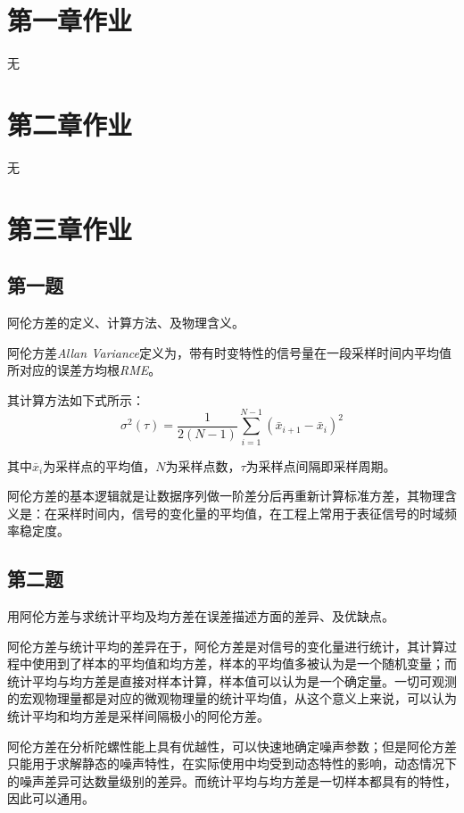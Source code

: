 \documentclass[11pt]{article}
\begin{document}
\newpage

\setcounter{tocdepth}{3}
\tableofcontents
\newpage

\setcounter{page}{1}
\section{第一章作业}
无
\section{第二章作业}
无
\section{第三章作业}
\subsection{第一题}
{\heiti 阿伦方差的定义、计算方法、及物理含义。}\par
阿伦方差\textit{Allan Variance}定义为，带有时变特性的信号量在一段采样时间内平均值所对应的误差方均根\textit{RME}。\par
其计算方法如下式所示：
\begin{equation}
  \sigma^2(\tau)=\frac{1}{2(N-1)}\sum_{i=1}^{N-1}(\bar{x}_{i+1}-\bar{x}_i)^2
\end{equation}\par
其中$\bar{x}_i$为采样点的平均值，$N$为采样点数，$\tau$为采样点间隔即采样周期。\par
阿伦方差的基本逻辑就是让数据序列做一阶差分后再重新计算标准方差\cite{HKJC202304012}，其物理含义是：在采样时间内，信号的变化量的平均值，在工程上常用于表征信号的时域频率稳定度。\par
\subsection{第二题}
{\heiti 用阿伦方差与求统计平均及均方差在误差描述方面的差异、及优缺点。}\par
阿伦方差与统计平均的差异在于，阿伦方差是对信号的变化量进行统计，其计算过程中使用到了样本的平均值和均方差，样本的平均值多被认为是一个随机变量；而统计平均与均方差是直接对样本计算，样本值可以认为是一个确定量。一切可观测的宏观物理量都是对应的微观物理量的统计平均值，从这个意义上来说，可以认为统计平均和均方差是采样间隔极小的阿伦方差。\par
阿伦方差在分析陀螺性能上具有优越性，可以快速地确定噪声参数；但是阿伦方差只能用于求解静态的噪声特性，在实际使用中均受到动态特性的影响，动态情况下的噪声差异可达数量级别的差异。而统计平均与均方差是一切样本都具有的特性，因此可以通用。
\end{document}
